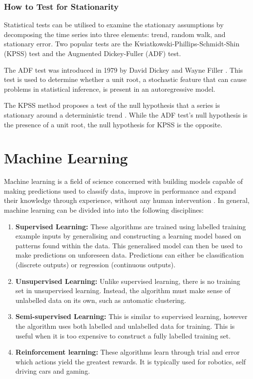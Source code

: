 \documentclass{UoYCSproject}
\begin{document}
\subsubsection{How to Test for Stationarity}
Statistical tests can be utilised to examine the stationary assumptions by decomposing the time series into three elements: trend, random walk, and stationary error. Two popular tests are the Kwiatkowski-Phillips-Schmidt-Shin (KPSS) test and the Augmented Dickey-Fuller (ADF) test.

The ADF test was introduced in 1979 by David Dickey and Wayne Filler \cite{dickey1979distribution}. This test is used to determine whether a unit root, a stochastic feature that can cause problems in statistical inference, is present in an autoregressive model. 

The KPSS method proposes a test of the null hypothesis that a series is stationary around a deterministic trend \cite{kwiatkowski1992testing}. While the ADF test's null hypothesis is the presence of a unit root, the null hypothesis for KPSS is the opposite. 

\section{Machine Learning}
Machine learning is a field of science concerned with building models capable of making predictions used to classify data, improve in performance and expand their knowledge through experience, without any human intervention \cite{mitchell1997}. 
In general, machine learning can be divided into into the following disciplines:

\begin{enumerate}
    \item \textbf{Supervised Learning:} These algorithms are trained using labelled training example inputs by generalising and constructing a learning model based on patterns found within the data. This generalised model can then be used to make predictions on unforeseen data. Predictions can either be classification (discrete outputs) or regression (continuous outputs). 
    
    \item \textbf{Unsupervised Learning:} Unlike supervised learning, there is no training set in unsupervised learning. Instead, the algorithm must make sense of unlabelled data on its own, such as automatic clustering.
    
    \item \textbf{Semi-supervised Learning:} This is similar to supervised learning, however the algorithm uses both labelled and unlabelled data for training. This is useful when it is too expensive to construct a fully labelled training set. 
    
    \item \textbf{Reinforcement learning:} These algorithms learn through trial and error which actions yield the greatest rewards. It is typically used for robotics, self driving cars and gaming.  
\end{enumerate}
\end{document}
